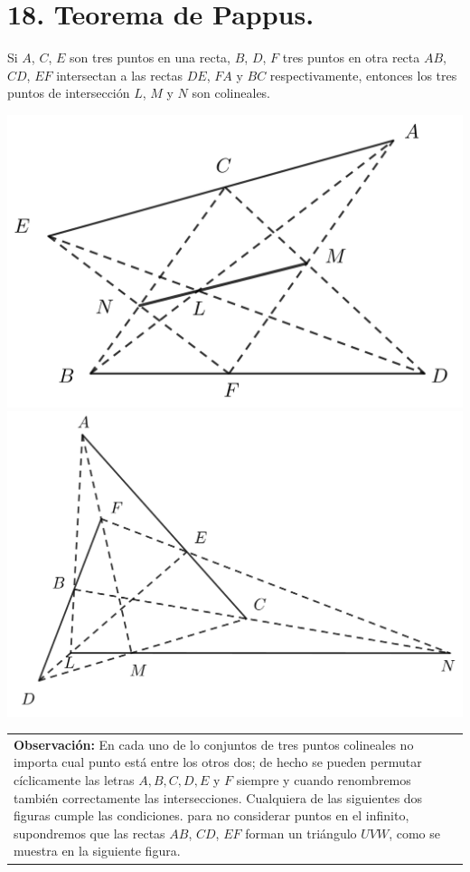 \documentclass[12pt,a4paper, oneside]{book}
\begin{document}
\section{18. Teorema de Pappus.}
Si $A$, $C$, $E$ son tres puntos en una recta, $B$, $D$, $F$ tres puntos en otra recta $AB$, $CD$, $EF$ intersectan a las rectas $DE$, $FA$ y $BC$ respectivamente, entonces los tres puntos de intersección $L$, $M$ y $N$ son colineales.
\\
\begin{center}
\includegraphics[scale=0.45]{Imagenes/pappus.png} 
\includegraphics[scale=0.45]{Imagenes/pappus1.png} 
\end{center}
\begin{tabular}{p{15.9 cm} p{1cm}}
\textbf{Observación:} En cada uno de lo conjuntos de tres puntos colineales no importa cual punto está entre los otros dos; de hecho se pueden permutar cíclicamente las letras $A, B, C, D, E$ y $F$ siempre y cuando renombremos también  correctamente las intersecciones. Cualquiera de las siguientes dos figuras cumple las condiciones. para no considerar puntos en el infinito, supondremos que las rectas $AB$, $CD$, $EF$ forman un triángulo $UVW$, como se muestra en la siguiente figura.
\end{tabular}
\end{document}
